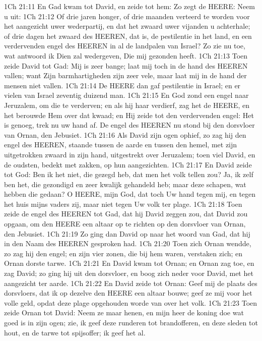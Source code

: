 1Ch 21:11  En Gad kwam tot David, en zeide tot hem: Zo zegt de HEERE: Neem u uit:
1Ch 21:12  Of drie jaren honger, of drie maanden verteerd te worden voor het aangezicht uwer wederpartij, en dat het zwaard uwer vijanden u achterhale; of drie dagen het zwaard des HEEREN, dat is, de pestilentie in het land, en een verdervenden engel des HEEREN in al de landpalen van Israel? Zo zie nu toe, wat antwoord ik Dien zal wedergeven, Die mij gezonden heeft.
1Ch 21:13  Toen zeide David tot Gad: Mij is zeer bange; laat mij toch in de hand des HEEREN vallen; want Zijn barmhartigheden zijn zeer vele, maar laat mij in de hand der mensen niet vallen.
1Ch 21:14  De HEERE dan gaf pestilentie in Israel; en er vielen van Israel zeventig duizend man.
1Ch 21:15  En God zond een engel naar Jeruzalem, om die te verderven; en als hij haar verdierf, zag het de HEERE, en het berouwde Hem over dat kwaad; en Hij zeide tot den verdervenden engel: Het is genoeg, trek nu uw hand af. De engel des HEEREN nu stond bij den dorsvloer van Ornan, den Jebusiet.
1Ch 21:16  Als David zijn ogen ophief, zo zag hij den engel des HEEREN, staande tussen de aarde en tussen den hemel, met zijn uitgetrokken zwaard in zijn hand, uitgestrekt over Jeruzalem; toen viel David, en de oudsten, bedekt met zakken, op hun aangezichten.
1Ch 21:17  En David zeide tot God: Ben ik het niet, die gezegd heb, dat men het volk tellen zou? Ja, ik zelf ben het, die gezondigd en zeer kwalijk gehandeld heb; maar deze schapen, wat hebben die gedaan? O HEERE, mijn God, dat toch Uw hand tegen mij, en tegen het huis mijns vaders zij, maar niet tegen Uw volk ter plage.
1Ch 21:18  Toen zeide de engel des HEEREN tot Gad, dat hij David zeggen zou, dat David zou opgaan, om den HEERE een altaar op te richten op den dorsvloer van Ornan, den Jebusiet.
1Ch 21:19  Zo ging dan David op naar het woord van Gad, dat hij in den Naam des HEEREN gesproken had.
1Ch 21:20  Toen zich Ornan wendde, zo zag hij den engel; en zijn vier zonen, die bij hem waren, verstaken zich; en Ornan dorste tarwe.
1Ch 21:21  En David kwam tot Ornan; en Ornan zag toe, en zag David; zo ging hij uit den dorsvloer, en boog zich neder voor David, met het aangezicht ter aarde.
1Ch 21:22  En David zeide tot Ornan: Geef mij de plaats des dorsvloers, dat ik op dezelve den HEERE een altaar bouwe; geef ze mij voor het volle geld, opdat deze plage opgehouden worde van over het volk.
1Ch 21:23  Toen zeide Ornan tot David: Neem ze maar henen, en mijn heer de koning doe wat goed is in zijn ogen; zie, ik geef deze runderen tot brandofferen, en deze sleden tot hout, en de tarwe tot spijsoffer; ik geef het al.
